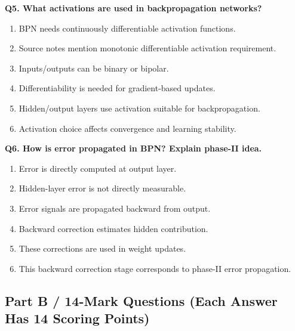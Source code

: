\documentclass[11pt,a4paper]{article}
\begin{document}
\textbf{Q5. What activations are used in backpropagation networks?}
\begin{enumerate}
\item BPN needs continuously differentiable activation functions.
\item Source notes mention monotonic differentiable activation requirement.
\item Inputs/outputs can be binary or bipolar.
\item Differentiability is needed for gradient-based updates.
\item Hidden/output layers use activation suitable for backpropagation.
\item Activation choice affects convergence and learning stability.
\end{enumerate}

\textbf{Q6. How is error propagated in BPN? Explain phase-II idea.}
\begin{enumerate}
\item Error is directly computed at output layer.
\item Hidden-layer error is not directly measurable.
\item Error signals are propagated backward from output.
\item Backward correction estimates hidden contribution.
\item These corrections are used in weight updates.
\item This backward correction stage corresponds to phase-II error propagation.
\end{enumerate}

\subsection*{Part B / 14-Mark Questions (Each Answer Has 14 Scoring Points)}
\end{document}
